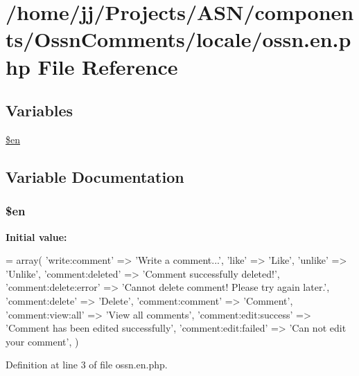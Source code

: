 \hypertarget{components_2_ossn_comments_2locale_2ossn_8en_8php}{}\section{/home/jj/\+Projects/\+A\+S\+N/components/\+Ossn\+Comments/locale/ossn.en.\+php File Reference}
\label{components_2_ossn_comments_2locale_2ossn_8en_8php}
\subsection*{Variables}
\begin{DoxyCompactItemize}
\item 
\hyperlink{components_2_ossn_comments_2locale_2ossn_8en_8php_a48abc714dfb71c8fffa83cf49f452115}{\$en}
\end{DoxyCompactItemize}


\subsection{Variable Documentation}
\subsubsection[{\texorpdfstring{\$en}{$en}}]{\setlength{\rightskip}{0pt plus 5cm}\$en}\hypertarget{components_2_ossn_comments_2locale_2ossn_8en_8php_a48abc714dfb71c8fffa83cf49f452115}{}\label{components_2_ossn_comments_2locale_2ossn_8en_8php_a48abc714dfb71c8fffa83cf49f452115}
{\bfseries Initial value\+:}
\begin{DoxyCode}
= array(
    \textcolor{stringliteral}{'write:comment'} => \textcolor{stringliteral}{'Write a comment...'},
    \textcolor{stringliteral}{'like'} => \textcolor{stringliteral}{'Like'},
    \textcolor{stringliteral}{'unlike'} => \textcolor{stringliteral}{'Unlike'},
    \textcolor{stringliteral}{'comment:deleted'} => \textcolor{stringliteral}{'Comment successfully deleted!'},
    \textcolor{stringliteral}{'comment:delete:error'} => \textcolor{stringliteral}{'Cannot delete comment! Please try again later.'},
    \textcolor{stringliteral}{'comment:delete'} => \textcolor{stringliteral}{'Delete'},
    \textcolor{stringliteral}{'comment:comment'} => \textcolor{stringliteral}{'Comment'},
    \textcolor{stringliteral}{'comment:view:all'} => \textcolor{stringliteral}{'View all comments'},
    \textcolor{stringliteral}{'comment:edit:success'} => \textcolor{stringliteral}{'Comment has been edited successfully'},
    \textcolor{stringliteral}{'comment:edit:failed'} => \textcolor{stringliteral}{'Can not edit your comment'},
)
\end{DoxyCode}


Definition at line 3 of file ossn.\+en.\+php.

